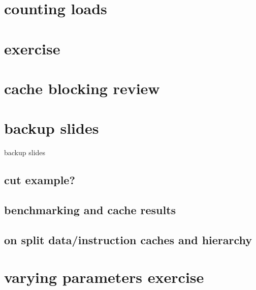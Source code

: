 %

\section{counting loads}
%


\section{exercise}



\section{cache blocking review}


\section{backup slides}
\begin{frame}{backup slides}
\end{frame}

\subsection{cut example?}


\subsection{benchmarking and cache results}


\subsection{on split data/instruction caches and hierarchy}


\section{varying parameters exercise}


